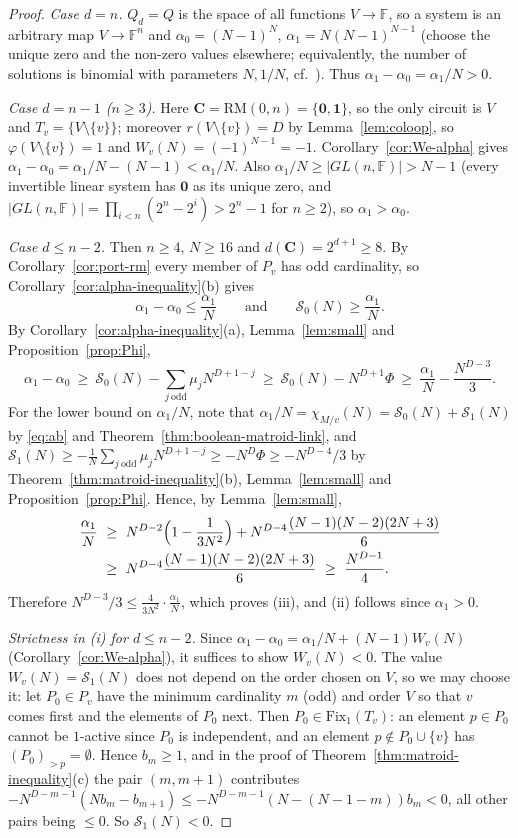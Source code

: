 \documentclass[11pt,a4paper]{article}
\theoremstyle{definition}
\newcommand{\FF}{\mathbb{F}}
\newcommand{\Fix}{\mathrm{Fix}}
\newcommand{\RM}{\mathrm{RM}}
\begin{document}
\begin{proof}
\emph{Case $d=n$.} $Q_d=Q$ is the space of all functions $V\to\FF$, so a system is an arbitrary map $V\to\FF^n$ and $\alpha_0=(N-1)^N$, $\alpha_1=N(N-1)^{N-1}$ (choose the unique zero and the non-zero values elsewhere; equivalently, the number of solutions is binomial with parameters $N,1/N$, cf.\ \cite[Theorem~1]{jain}). Thus $\alpha_1-\alpha_0=\alpha_1/N>0$.

\emph{Case $d=n-1$ ($n\ge3$).} Here $\mathbf{C}=\RM(0,n)=\{\mathbf0,\mathbf1\}$, so the only circuit is $V$ and $T_v=\{V\setminus\{v\}\}$; moreover $r(V\setminus\{v\})=D$ by Lemma~\ref{lem:coloop}, so $\varphi(V\setminus\{v\})=1$ and $W_v(N)=(-1)^{N-1}=-1$. Corollary~\ref{cor:We-alpha} gives $\alpha_1-\alpha_0=\alpha_1/N-(N-1)<\alpha_1/N$. Also $\alpha_1/N\ge|GL(n,\FF)|>N-1$ (every invertible linear system has $\mathbf0$ as its unique zero, and $|GL(n,\FF)|=\prod_{i<n}(2^n-2^i)>2^n-1$ for $n\ge2$), so $\alpha_1>\alpha_0$.

\emph{Case $d\le n-2$.} Then $n\ge4$, $N\ge16$ and $d(\mathbf{C})=2^{d+1}\ge8$. By Corollary~\ref{cor:port-rm} every member of $P_v$ has odd cardinality, so Corollary~\ref{cor:alpha-inequality}(b) gives
\[
\alpha_1-\alpha_0\le\frac{\alpha_1}N\qquad\text{and}\qquad \mathcal S_0(N)\ge\frac{\alpha_1}N .
\]
By Corollary~\ref{cor:alpha-inequality}(a), Lemma~\ref{lem:small} and Proposition~\ref{prop:Phi},
\[
\alpha_1-\alpha_0\ \ge\ \mathcal S_0(N)-\sum_{j\ \mathrm{odd}}\mu_jN^{D+1-j}\ \ge\ \mathcal S_0(N)-N^{D+1}\Phi\ \ge\ \frac{\alpha_1}N-\frac{N^{D-3}}{3}.
\]
For the lower bound on $\alpha_1/N$, note that $\alpha_1/N=\chi_{M/v}(N)=\mathcal S_0(N)+\mathcal S_1(N)$ by \eqref{eq:ab} and Theorem~\ref{thm:boolean-matroid-link}, and $\mathcal S_1(N)\ge-\frac1N\sum_{j\ \mathrm{odd}}\mu_jN^{D+1-j}\ge-N^{D}\Phi\ge-N^{D-4}/3$ by Theorem~\ref{thm:matroid-inequality}(b), Lemma~\ref{lem:small} and Proposition~\ref{prop:Phi}. Hence, by Lemma~\ref{lem:small},
\begin{align*}
\frac{\alpha_1}N\ &\ge\ N^{D-2}\Bigl(1-\frac1{3N^2}\Bigr)+N^{D-4}\frac{(N-1)(N-2)(2N+3)}6\\
&\ge\ N^{D-4}\frac{(N-1)(N-2)(2N+3)}6\ \ge\ \frac{N^{D-1}}4 .
\end{align*}
Therefore $N^{D-3}/3\le\frac4{3N^2}\cdot\frac{\alpha_1}N$, which proves (iii), and (ii) follows since $\alpha_1>0$.

\emph{Strictness in (i) for $d\le n-2$.} Since $\alpha_1-\alpha_0=\alpha_1/N+(N-1)W_v(N)$ (Corollary~\ref{cor:We-alpha}), it suffices to show $W_v(N)<0$. The value $W_v(N)=\mathcal S_1(N)$ does not depend on the order chosen on $V$, so we may choose it: let $P_0\in P_v$ have the minimum cardinality $m$ (odd) and order $V$ so that $v$ comes first and the elements of $P_0$ next. Then $P_0\in\Fix_1(T_v)$: an element $p\in P_0$ cannot be $1$-active since $P_0$ is independent, and an element $p\notin P_0\cup\{v\}$ has $(P_0)_{>p}=\emptyset$. Hence $b_m\ge1$, and in the proof of Theorem~\ref{thm:matroid-inequality}(c) the pair $(m,m+1)$ contributes $-N^{D-m-1}(Nb_m-b_{m+1})\le-N^{D-m-1}(N-(N-1-m))b_m<0$, all other pairs being $\le0$. So $\mathcal S_1(N)<0$.
\end{proof}
\end{document}
